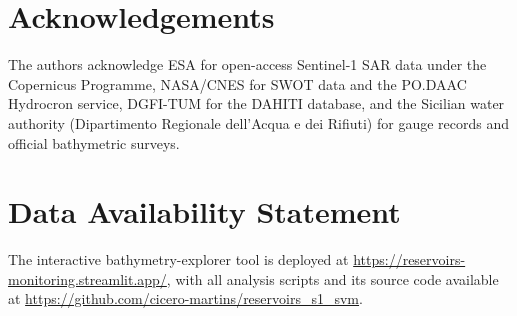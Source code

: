 \documentclass[review,12pt,authoryear]{elsarticle}
\begin{document}







\section*{Acknowledgements}
The authors acknowledge ESA for open-access Sentinel-1 SAR data under the
Copernicus Programme, NASA/CNES for SWOT data and the PO.DAAC Hydrocron service,
DGFI-TUM for the DAHITI database, and the Sicilian water authority
(Dipartimento Regionale dell'Acqua e dei Rifiuti) for gauge records and official
bathymetric surveys.

\section*{Data Availability Statement}
The interactive bathymetry-explorer tool is deployed at
\url{https://reservoirs-monitoring.streamlit.app/}, with all analysis scripts and
its source code available at
\url{https://github.com/cicero-martins/reservoirs_s1_svm}.



\end{document}
